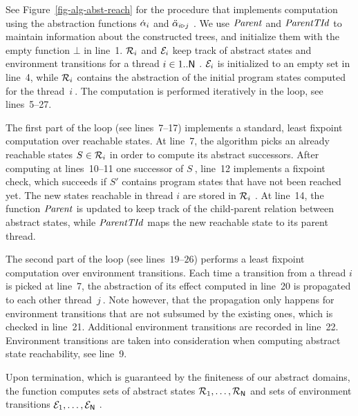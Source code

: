 See Figure~\ref{fig-alg-abst-reach} for the procedure
\algAbstReachEnvSolve that implements \aret computation using the
abstraction functions $\dot{\alpha}_i$ and $\ddot{\alpha}_{i\triangleright j}\ $.
We use $\mathit{Parent}$ and $\mathit{ParentTId}$ to maintain information about the
constructed trees, and initialize them with the empty function $\bot$
in line~1.
$\mathcal{R}_{i}$ and $\mathcal{E}_{i}$ keep track of abstract states
and environment transitions for a thread $i\in1..\mathsf{N}\ $. 
$\mathcal{E}_{i}$ is initialized to an empty set in line~4, while
$\mathcal{R}_{i}$ contains the abstraction of the initial program
states computed for the thread~$i\ $.
The \aret computation is performed iteratively in the \algRepeat loop,
see lines~5--27.


The first part of the loop (see lines~7--17) implements a standard, 
least fixpoint computation over reachable states.
At line~7, the algorithm picks an already reachable states
$S\in\mathcal{R}_{i}$ in order to compute its abstract successors. 
After computing at lines~10--11 one successor of $S\ $, line~12 implements
a fixpoint check, which succeeds if $S'$ contains program states that
have not been reached yet.
The new states reachable in thread $i$ are stored in
$\mathcal{R}_{i}\ $.
At line~14, the function $\mathit{Parent}$ is updated to keep track of the
child-parent relation between abstract states, while $\mathit{ParentTId}$ maps
the new reachable state to its parent thread.


The second part of the loop (see lines~$19$--$26$) performs a least
fixpoint computation over environment transitions. 
Each time a transition from a thread $i$ is picked at line~7, the
abstraction of its effect computed in line~20 is propagated to each
other thread~$j\ $.
Note however, that the propagation only happens for environment
transitions that are not subsumed by the existing ones, which is
checked in line~21.
Additional environment transitions are recorded in line~22.
Environment transitions are taken into consideration when computing
abstract state reachability, see line~9.

Upon termination, which is guaranteed by the finiteness of our
abstract domains, the function \algAbstReachEnvSolve computes sets of
abstract states $\mathcal{R}_{1}, \dots, \mathcal{R}_{\mathsf{N}}$ and sets of
environment transitions $\EnvTransOf{1}, \dots, \EnvTransOf{\Num}\ $.




